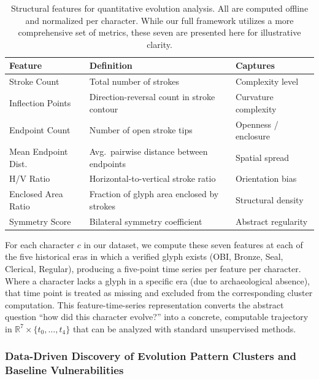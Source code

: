 \documentclass{article}
\begin{document}
\begin{table}[h]
  \centering
  \caption{Structural features for quantitative evolution analysis. All are computed offline and normalized per character. While our full framework utilizes a more comprehensive set of metrics, these seven are presented here for illustrative clarity.}
  \label{tab:pre:features}
  \begin{tabular}{lll}
    \toprule
    \textbf{Feature} & \textbf{Definition} & \textbf{Captures} \\
    \midrule
    Stroke Count         & Total number of strokes                  & Complexity level \\
    Inflection Points    & Direction-reversal count in stroke contour & Curvature complexity \\
    Endpoint Count       & Number of open stroke tips               & Openness / enclosure \\
    Mean Endpoint Dist.  & Avg.\ pairwise distance between endpoints & Spatial spread \\
    H/V Ratio            & Horizontal-to-vertical stroke ratio       & Orientation bias \\
    Enclosed Area Ratio  & Fraction of glyph area enclosed by strokes & Structural density \\
    Symmetry Score       & Bilateral symmetry coefficient            & Abstract regularity \\
    \bottomrule
  \end{tabular}
\end{table}

For each character $c$ in our dataset, we compute these seven features at each of the five historical eras in which a verified glyph exists (OBI, Bronze, Seal, Clerical, Regular), producing a five-point time series per feature per character. Where a character lacks a glyph in a specific era (due to archaeological absence), that time point is treated as missing and excluded from the corresponding cluster computation. This feature-time-series representation converts the abstract question ``how did this character evolve?'' into a concrete, computable trajectory in $\mathbb{R}^7 \times \{t_0, \ldots, t_4\}$ that can be analyzed with standard unsupervised methods.

\subsubsection{Data-Driven Discovery of Evolution Pattern Clusters and Baseline Vulnerabilities}
\label{sec:pre:s8}
\end{document}
